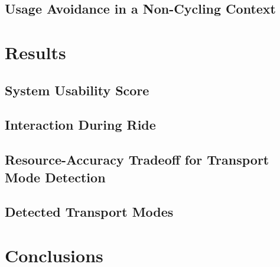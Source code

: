 \subsection{Usage Avoidance in a Non-Cycling Context}

\section{Results}

\subsection{System Usability Score}

\subsection{Interaction During Ride}

\subsection{Resource-Accuracy Tradeoff for Transport Mode Detection}

\subsection{Detected Transport Modes}

\section{Conclusions}
